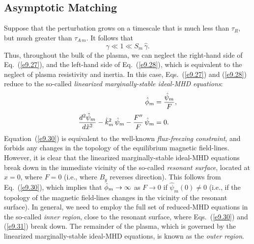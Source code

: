 \documentclass[12pt,prb,aps]{revtex4-1}
\begin{document}
\subsection{Asymptotic Matching}
Suppose that the perturbation   grows on a timescale that is much less than $\tau_R$, but much greater than
$\tau_{A\,m}$. It follows that
\begin{equation}\label{e9.29}
\hat{\gamma} \ll 1 \ll S_m\,\hat{\gamma}.
\end{equation}
Thus, throughout the bulk of the plasma, we can neglect the right-hand side of Eq.~(\ref{e9.27}), and the left-hand side of Eq.~(\ref{e9.28}), which is equivalent to the neglect of plasma resistivity and inertia. In this case,
Eqs.~(\ref{e9.27}) and (\ref{e9.28}) reduce to the so-called {\em linearized marginally-stable ideal-MHD equations}:
\begin{align}
\skew{3}\hat{\phi}_m &= \frac{\hat{\psi}_m}{F},\label{e9.30}\\[0.5ex]
\frac{d^2\hat{\psi}_m}{d\hat{x}^2} - \hat{k}_m^2\,\hat{\psi}_m-\frac{F''}{F}\,\hat{\psi}_m &= 0.\label{e9.31}
\end{align}
Equation~(\ref{e9.30}) is equivalent to the well-known {\em flux-freezing constraint}, and forbids any changes in the
topology of the equilibrium magnetic field-lines. 
However, it is clear that the linearized marginally-stable ideal-MHD  equations break down in the
immediate vicinity of the so-called {\em resonant surface}, located at $x=0$,  where $F=0$ (i.e., where $B_y$ reverses direction). This follows from Eq.~(\ref{e9.30}), which implies that $\skew{3}\hat{\phi}_m\rightarrow\infty$ as $F\rightarrow 0$ if $\hat{\psi}_m(0)\neq 0$ (i.e., if the topology of the magnetic
field-lines changes in the  vicinity of the resonant surface). 
 In general, we need to employ the full set of reduced-MHD equations in the so-called {\em inner region}, close to the resonant
surface, where Eqs.~(\ref{e9.30}) and (\ref{e9.31}) break down. The remainder of the plasma,
which is governed by the linearized marginally-stable ideal-MHD  equations, is known as the {\em outer region}. 
\end{document}

